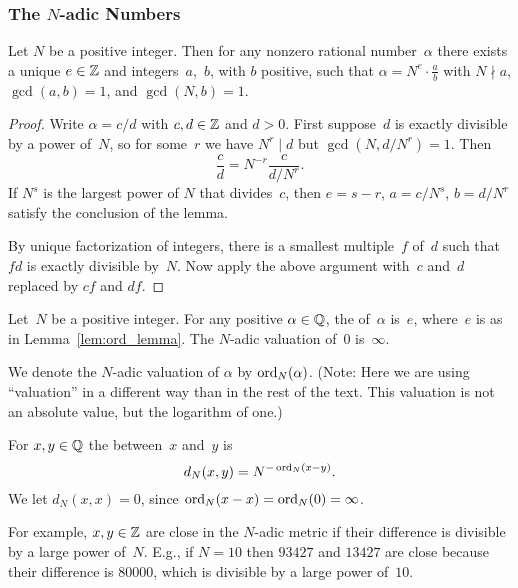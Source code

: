 \subsubsection{The $N$-adic Numbers}
\label{sec:nadic}

\begin{lemma}\label{lem:ord_lemma}
Let $N$ be a positive integer.  Then for any 
nonzero rational number~$\alpha$ there exists a
unique $e\in\mathbb{Z}$ and  integers~$a$,~$b$, with $b$ positive, such that 
$\alpha = N^e \cdot \frac{a}{b}$ with
$N\nmid a$, $\gcd(a,b)=1$, and $\gcd(N,b)=1$.
\end{lemma}
\begin{proof}
Write $\alpha = c/d$ with $c,d\in\mathbb{Z}$ and $d>0$.  
First suppose~$d$ is exactly divisible by a power of~$N$, 
so for some~$r$ we have $N^r\mid d$ but $\gcd(N,d/N^r)=1$.  
Then 
$$
  \frac{c}{d} = N^{-r} \frac{c}{d/N^r}.
$$
If $N^s$ is the largest power of $N$ that divides~$c$, then $e=s-r$,
$a=c/N^s$, $b=d/N^r$ satisfy the conclusion of the lemma.

By unique factorization of integers, there is a smallest multiple~$f$
of~$d$ such that $fd$ is exactly divisible by~$N$.  Now apply the
above argument with~$c$ and~$d$ replaced by $cf$ and $df$.
\end{proof}


\begin{definition}
\label{def:nadicvaluation}
Let~$N$ be a positive integer.  For any positive $\alpha\in\mathbb{Q}$, the 
 of~$\alpha$ is~$e$, where~$e$ is as in
Lemma~\ref{lem:ord_lemma}.  The $N$-adic  valuation of~$0$ is~$\infty$.  
\end{definition}
We denote the $N$-adic valuation of $\alpha$ by $\operatorname{ord}_N(\alpha)$.
(Note: Here we are using ``valuation'' in a different way than in the
rest of the text.  This valuation is not an absolute value, but the
logarithm of one.)

\begin{definition}
\label{def:nadicmetric}
For $x,y\in\mathbb{Q}$ the  
between~$x$ and~$y$ is
$$
  d_N(x,y) = N^{-\operatorname{ord}_N(x-y)}.
$$
We let $d_N(x,x) = 0$, since $\operatorname{ord}_N(x-x)=\operatorname{ord}_N(0)=\infty$.
\end{definition}
For example, $x,y\in\mathbb{Z}$ are close  in the $N$-adic metric if their
difference is divisible by a large power of~$N$.   E.g., if $N=10$ then
$93427$ and $13427$ are close because their difference is $80000$, which 
is divisible by a large power of~$10$.

